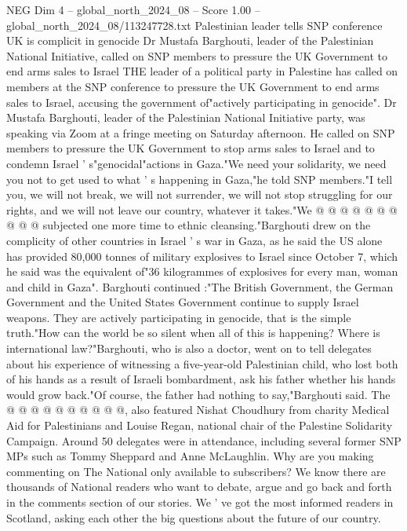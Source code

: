 \begin{textsample}{NEG Dim 4 – global\_north\_2024\_08 – Score 1.00 – global\_north\_2024\_08/113247728.txt}  \label{ex:f4_neg_297}
Palestinian leader tells SNP conference UK is complicit in genocide Dr Mustafa Barghouti, leader of the Palestinian National Initiative, called on SNP members to pressure the UK Government to end arms sales to Israel THE leader of a political party in Palestine has called on members at the SNP conference to pressure the UK Government to end arms sales to Israel, accusing the government of"actively participating in genocide".
Dr Mustafa Barghouti, leader of the Palestinian National Initiative party, was speaking via Zoom at a fringe meeting on Saturday afternoon.
He called on SNP members to pressure the UK Government to stop arms sales to Israel and to condemn Israel ' s"genocidal"actions in Gaza."We need your solidarity, we need you not to get used to what ' s happening in Gaza,"he told SNP members."I tell you, we will not break, we will not surrender, we will not stop struggling for our rights, and we will not leave our country, whatever it takes."We @ @ @ @ @ @ @ @ @ @ subjected one more time to ethnic cleansing."Barghouti drew on the complicity of other countries in Israel ' s war in Gaza, as he said the US alone has provided 80,000 tonnes of military explosives to Israel since October 7, which he said was the equivalent of"36 kilogrammes of explosives for every man, woman and child in Gaza".
Barghouti continued :"The British Government, the German Government and the United States Government continue to supply Israel weapons.
They are actively participating in genocide, that is the simple truth."How can the world be so silent when all of this is happening?
Where is international law?"Barghouti, who is also a doctor, went on to tell delegates about his experience of witnessing a five-year-old Palestinian child, who lost both of his hands as a result of Israeli bombardment, ask his father whether his hands would grow back."Of course, the father had nothing to say,"Barghouti said.
The @ @ @ @ @ @ @ @ @ @, also featured Nishat Choudhury from charity Medical Aid for Palestinians and Louise Regan, national chair of the Palestine Solidarity Campaign.
Around 50 delegates were in attendance, including several former SNP MPs such as Tommy Sheppard and Anne McLaughlin.
Why are you making commenting on The National only available to subscribers?
We know there are thousands of National readers who want to debate, argue and go back and forth in the comments section of our stories.
We ' ve got the most informed readers in Scotland, asking each other the big questions about the future of our country.

\end{textsample}
